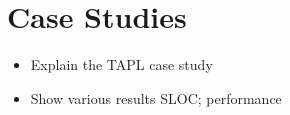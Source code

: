 \section{Case Studies}\label{sec:casestudy}

\begin{itemize}
\item Explain the TAPL case study
\item Show various results SLOC; performance
\end{itemize}